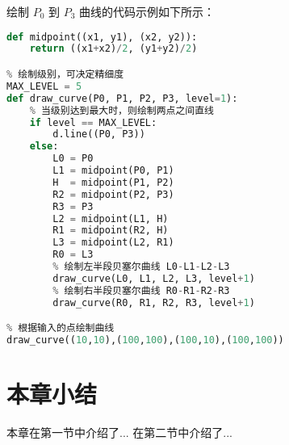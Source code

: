 绘制 $P_0$ 到 $P_3$ 曲线的代码示例如下所示：

\begin{lstlisting}[language=python]
% 返回这两点间线段的中点
def midpoint((x1, y1), (x2, y2)):
    return ((x1+x2)/2, (y1+y2)/2)

% 绘制级别，可决定精细度
MAX_LEVEL = 5
def draw_curve(P0, P1, P2, P3, level=1):
    % 当级别达到最大时，则绘制两点之间直线
    if level == MAX_LEVEL:
        d.line((P0, P3))
    else:
        L0 = P0
        L1 = midpoint(P0, P1)
        H  = midpoint(P1, P2)
        R2 = midpoint(P2, P3)
        R3 = P3
        L2 = midpoint(L1, H)
        R1 = midpoint(R2, H)
        L3 = midpoint(L2, R1)
        R0 = L3
        % 绘制左半段贝塞尔曲线 L0-L1-L2-L3
        draw_curve(L0, L1, L2, L3, level+1)
        % 绘制右半段贝塞尔曲线 R0-R1-R2-R3
        draw_curve(R0, R1, R2, R3, level+1)

% 根据输入的点绘制曲线
draw_curve((10,10),(100,100),(100,10),(100,100))
\end{lstlisting}


\section{本章小结}

本章在第一节中介绍了...
在第二节中介绍了...
